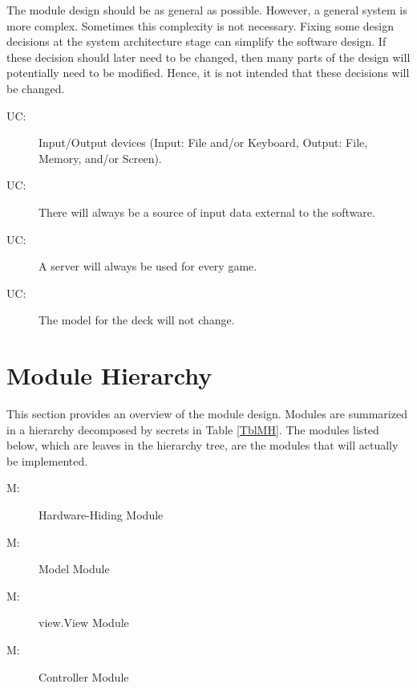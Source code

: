 \documentclass[12pt, titlepage]{article}
\newcounter{ucnum}
\newcommand{\uctheucnum}{UC\theucnum}
\newcounter{mnum}
\newcommand{\mthemnum}{M\themnum}
\begin{document}
The module design should be as general as possible. However, a general system is
more complex. Sometimes this complexity is not necessary. Fixing some design
decisions at the system architecture stage can simplify the software design. If
these decision should later need to be changed, then many parts of the design
will potentially need to be modified. Hence, it is not intended that these
decisions will be changed.

\begin{description}
\item[ \uctheucnum \label{ucIO}:] Input/Output devices (Input: File and/or Keyboard, Output: File, Memory, and/or Screen).
\item[ \uctheucnum \label{ucInput}:] There will always be a source of input data external to the software.
\item[ \uctheucnum:] A server will always be used for every game.
\item[ \uctheucnum:] The model for the deck will not change.
\end{description}

\section{Module Hierarchy} \label{SecMH}

This section provides an overview of the module design. Modules are summarized
in a hierarchy decomposed by secrets in Table \ref{TblMH}. The modules listed
below, which are leaves in the hierarchy tree, are the modules that will
actually be implemented.

\begin{description}
\item [ \mthemnum \label{mHH}:] Hardware-Hiding Module
\item [ \mthemnum \label{mModel}:] Model Module
\item [ \mthemnum \label{mView}:] view.View Module
\item [ \mthemnum \label{mController}:] Controller Module
\end{description}
\end{document}
